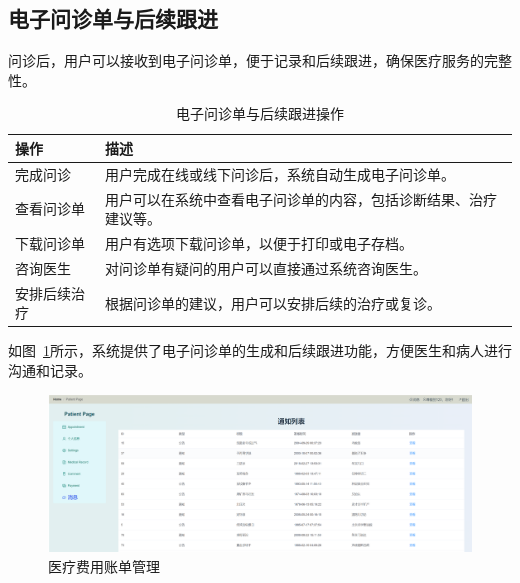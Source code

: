 \subsection{电子问诊单与后续跟进}
问诊后，用户可以接收到电子问诊单，便于记录和后续跟进，确保医疗服务的完整性。
\begin{table}[htbp]
	\centering
	\begin{tabular}{|p{6cm}|p{6cm}|}
		\hline
		\textbf{操作} & \textbf{描述} \\
		\hline
		完成问诊 & 用户完成在线或线下问诊后，系统自动生成电子问诊单。 \\
		查看问诊单 & 用户可以在系统中查看电子问诊单的内容，包括诊断结果、治疗建议等。 \\
		下载问诊单 & 用户有选项下载问诊单，以便于打印或电子存档。 \\
		咨询医生 & 对问诊单有疑问的用户可以直接通过系统咨询医生。 \\
		安排后续治疗 & 根据问诊单的建议，用户可以安排后续的治疗或复诊。 \\
		\hline
	\end{tabular}
	\caption{电子问诊单与后续跟进操作}
\end{table}
如图~\ref{a15}所示，系统提供了电子问诊单的生成和后续跟进功能，方便医生和病人进行沟通和记录。
\begin{figure}[!h]
	\centering
	\includegraphics[width=\textwidth]{figures/a15.png}
	\caption{医疗费用账单管理}
	\label{a15}
\end{figure}


